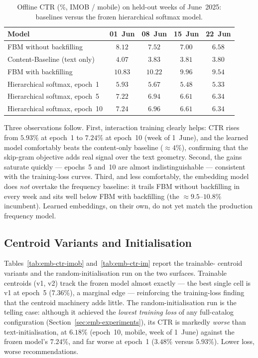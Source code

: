 \begin{table}[ht]
  \centering
  \caption{Offline CTR (\%, IMOB / mobile) on held-out weeks of June~2025:
           baselines versus the frozen hierarchical softmax model.}
  \label{tab:emb-ctr-main}
  \small
  \begin{tabular}{lcccc}
    \toprule
    Model & 01~Jun & 08~Jun & 15~Jun & 22~Jun \\
    \midrule
    FBM without backfilling      & $8.12$ & $7.52$ & $7.00$ & $6.58$ \\
    Content-Baseline (text only) & $4.07$ & $3.83$ & $3.81$ & $3.80$ \\
    FBM with backfilling         & $\mathbf{10.83}$ & $\mathbf{10.22}$ & $\mathbf{9.96}$ & $\mathbf{9.54}$ \\
    \midrule
    Hierarchical softmax, epoch~1  & $5.93$ & $5.67$ & $5.48$ & $5.33$ \\
    Hierarchical softmax, epoch~5  & $7.22$ & $6.94$ & $6.61$ & $6.34$ \\
    Hierarchical softmax, epoch~10 & $7.24$ & $6.96$ & $6.61$ & $6.34$ \\
    \bottomrule
  \end{tabular}
\end{table}

Three observations follow. First, interaction training clearly helps: CTR rises
from $5.93\%$ at epoch~1 to $7.24\%$ at epoch~10 (week of 1~June), and the
learned model comfortably beats the content-only baseline ($\approx 4\%$),
confirming that the skip-gram objective adds real signal over the text geometry.
Second, the gains saturate quickly --- epochs~5 and~10 are almost
indistinguishable --- consistent with the training-loss curves. Third, and less
comfortably, the embedding model does \emph{not} overtake the frequency
baseline: it trails FBM without backfilling in every week and sits well below
FBM with backfilling (the $\approx 9.5$--$10.8\%$ incumbent). Learned
embeddings, on their own, do not yet match the production frequency model.

\subsection{Centroid Variants and Initialisation}
\label{sec:emb-variants-ctr}
Tables~\ref{tab:emb-ctr-imob} and~\ref{tab:emb-ctr-im} report the trainable-%
centroid variants and the random-initialisation run on the two surfaces.
Trainable centroids (v1, v2) track the frozen model almost exactly --- the best
single cell is v1 at epoch~5 ($7.36\%$), a marginal edge --- reinforcing the
training-loss finding that the centroid machinery adds little. The
random-initialisation run is the telling case: although it achieved the
\emph{lowest training loss} of any full-catalog configuration
(Section~\ref{sec:emb-experiments}), its CTR is markedly \emph{worse} than
text-initialisation, at $6.18\%$ (epoch~10, mobile, week of 1~June) against the
frozen model's $7.24\%$, and far worse at epoch~1 ($3.48\%$ versus $5.93\%$).
Lower loss, worse recommendations.

